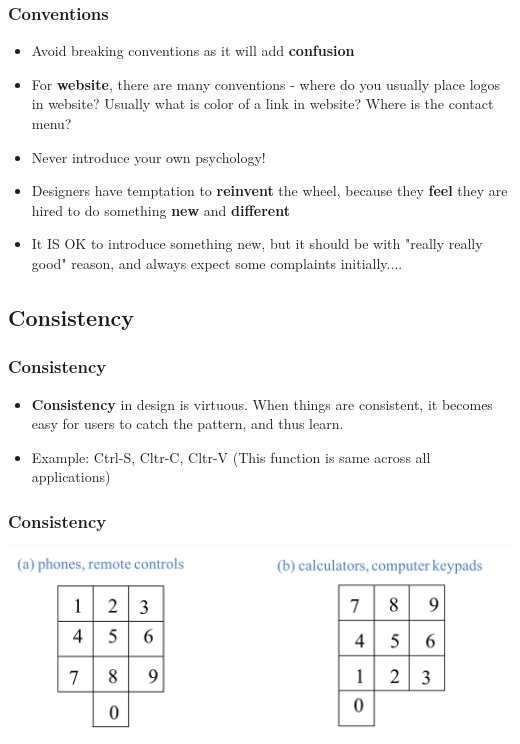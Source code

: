 \documentclass{beamer}
\begin{document}
\begin{frame}
\frametitle{Conventions}
\begin{itemize}
	\item Avoid breaking conventions as it will add \textbf{confusion}
	\item For \textbf{website}, there are many conventions - where do you usually place logos in website?  Usually what is color of a link in website?  Where is the contact menu?  %
	\item Never introduce your own psychology! 
	\item Designers have temptation to \textbf{reinvent} the wheel, because they \textbf{feel} they are hired to do something \textbf{new} and \textbf{different}
	\item It IS OK to introduce something new, but it should be with "really really good" reason, and always expect some complaints initially....
\end{itemize}
\end{frame}

\subsection{Consistency}

\begin{frame}
\frametitle{Consistency}
\begin{itemize}
	\item \textbf{Consistency} in design is virtuous.  When things are consistent, it becomes easy for users to catch the pattern, and thus learn. 
	\item Example: Ctrl-S, Cltr-C, Cltr-V   (This function is same across all applications)
\end{itemize}
\end{frame}

\begin{frame}
\frametitle{Consistency}
\centering
\includegraphics[width=1\linewidth]{consistent1}
\end{frame}
\end{document}
